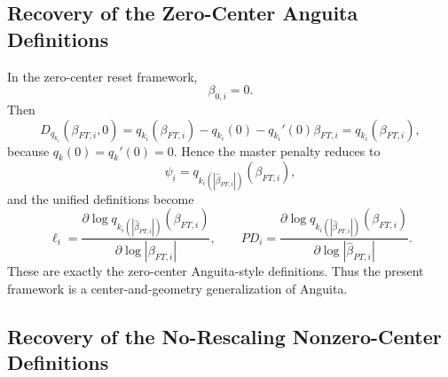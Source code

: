 \documentclass[11pt]{article}
\begin{document}
\subsection{Recovery of the Zero-Center Anguita Definitions}

In the zero-center reset framework,
\begin{equation}
    \beta_{0,i}=0.
\end{equation}
Then
\begin{equation}
    D_{q_{k_i}}(\beta_{FT,i},0)
    =
    q_{k_i}(\beta_{FT,i})-q_{k_i}(0)-q_{k_i}'(0)\beta_{FT,i}
    =
    q_{k_i}(\beta_{FT,i}),
\end{equation}
because \(q_k(0)=q_k'(0)=0\). Hence the master penalty reduces to
\begin{equation}
    \psi_i=q_{k_i(|\widehat\beta_{PT,i}|)}(\beta_{FT,i}),
\end{equation}
and the unified definitions become
\begin{equation}
    \ell_i
    =
    \frac{\partial\log q_{k_i(|\widehat\beta_{PT,i}|)}(\beta_{FT,i})}{\partial\log |\beta_{FT,i}|},
    \qquad
    PD_i
    =
    \frac{\partial\log q_{k_i(|\widehat\beta_{PT,i}|)}(\beta_{FT,i})}{\partial\log |\widehat\beta_{PT,i}|}.
\end{equation}
These are exactly the zero-center Anguita-style definitions. Thus the present framework is a center-and-geometry generalization of Anguita.

\subsection{Recovery of the No-Rescaling Nonzero-Center Definitions}
\end{document}
